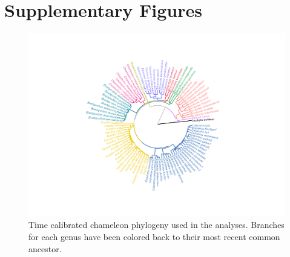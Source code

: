 \documentclass[a4paper, 12pt]{article}
\begin{document}
\newpage
\section{Supplementary Figures}

\begin{figure}[H]
 \centering
  \includegraphics[width = \linewidth]{figures/trees-genera-colour.png}
  \caption{Time calibrated chameleon phylogeny used in the analyses. 
  Branches for each genus have been colored back to their most recent common ancestor.
}
  \label{fig-phylo}
\end{figure}
\end{document}
